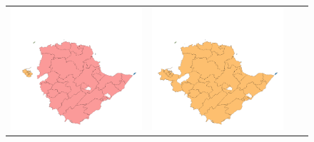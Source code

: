 \begin{figure}[p]
\begin{tabularx}{1\textwidth}{XXXX}
\includegraphics[width=1\linewidth]{images/ch6/contig/21}&
\includegraphics[width=1\linewidth]{images/ch6/contig/22}&

\end{tabularx}
\end{figure}
